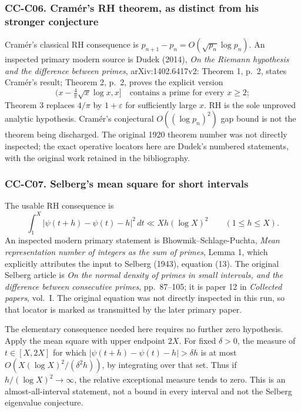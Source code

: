 \documentclass[11pt,a4paper]{article}
\theoremstyle{definition}\newtheorem{definition}[theorem]{Definition}
\theoremstyle{remark}\newtheorem{remark}[theorem]{Remark}
\begin{document}
\subsubsection{CC-C06. Cramér's RH theorem, as distinct from his
stronger
conjecture}\label{cc-c06.-cramuxe9rs-rh-theorem-as-distinct-from-his-stronger-conjecture}

Cramér's classical RH consequence is
\(p_{n+1}-p_n=O(\sqrt{p_n}\log p_n)\). An inspected primary modern
source is Dudek (2014), \emph{On the Riemann hypothesis and the
difference between primes}, arXiv:1402.6417v2: Theorem 1, p.~2, states
Cramér's result; Theorem 2, p.~2, proves the explicit version \[
 (x-\tfrac4\pi\sqrt x\log x,x]\quad\text{contains a prime for every }x\ge2;
\] Theorem 3 replaces \(4/\pi\) by \(1+\varepsilon\) for sufficiently
large \(x\). RH is the sole unproved analytic hypothesis. Cramér's
conjectural \(O((\log p_n)^2)\) gap bound is not the theorem being
discharged. The original 1920 theorem number was not directly inspected;
the exact operative locators here are Dudek's numbered statements, with
the original work retained in the bibliography.

\subsubsection{CC-C07. Selberg's mean square for short
intervals}\label{cc-c07.-selbergs-mean-square-for-short-intervals}

The usable RH consequence is \[
 \int_1^X|\psi(t+h)-\psi(t)-h|^2\,dt
 \ll Xh(\log X)^2\qquad(1\le h\le X).
\] An inspected modern primary statement is Bhowmik--Schlage-Puchta,
\emph{Mean representation number of integers as the sum of primes},
Lemma 1, which explicitly attributes the input to Selberg (1943),
equation (13). The original Selberg article is \emph{On the normal
density of primes in small intervals, and the difference between
consecutive primes}, pp.~87--105; it is paper 12 in \emph{Collected
papers}, vol.~I. The original equation was not directly inspected in
this run, so that locator is marked as transmitted by the later primary
paper.

The elementary consequence needed here requires no further zero
hypothesis. Apply the mean square with upper endpoint \(2X\). For fixed
\(\delta>0\), the measure of \(t\in[X,2X]\) for which
\(|\psi(t+h)-\psi(t)-h|>\delta h\) is at most
\(O(X(\log X)^2/(\delta^2h))\), by integrating over that set. Thus if
\(h/(\log X)^2\to\infty\), the relative exceptional measure tends to
zero. This is an almost-all-interval statement, not a bound in every
interval and not the Selberg eigenvalue conjecture.
\end{document}
